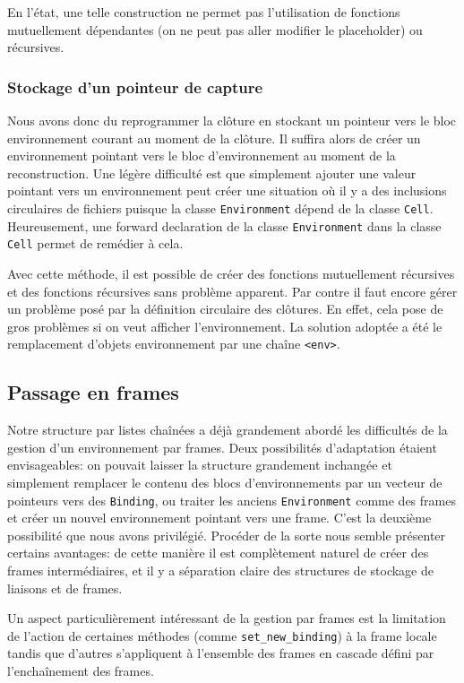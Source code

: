 \documentclass[a4paper,11pt]{article}
\begin{document}
En l'état, une telle construction ne permet pas l'utilisation de fonctions
mutuellement dépendantes (on ne peut pas aller modifier le placeholder) ou
récursives.

\subsubsection{Stockage d'un pointeur de capture}

Nous avons donc du reprogrammer la clôture en stockant un pointeur vers le bloc
environnement courant au moment de la clôture. Il suffira alors de créer un
environnement pointant vers le bloc d'environnement au moment de la reconstruction.
Une légère difficulté est que simplement ajouter une valeur pointant vers un
environnement peut créer une situation où il y a des inclusions circulaires de
fichiers puisque la classe \texttt{Environment} dépend de la classe \texttt{Cell}.
Heureusement, une forward declaration de la classe \texttt{Environment} dans la classe
\texttt{Cell} permet de remédier à cela.

Avec cette méthode, il est possible de créer des fonctions mutuellement
récursives et des fonctions récursives sans problème apparent. Par contre il
faut encore gérer un problème posé par la définition circulaire des clôtures.
En effet, cela pose de gros problèmes si on veut afficher l'environnement. La
solution adoptée a été le remplacement d'objets environnement par une chaîne
\texttt{<env>}.

\subsection{Passage en frames}

Notre structure par listes chaînées a déjà grandement abordé les difficultés de la
gestion d'un environnement par frames. Deux possibilités d'adaptation étaient
envisageables: on pouvait laisser la structure grandement inchangée et
simplement remplacer le contenu des blocs d'environnements par un vecteur de
pointeurs vers des \texttt{Binding}, ou traiter les anciens
\texttt{Environment} comme des frames et créer un nouvel environnement pointant
vers une frame. C'est la deuxième possibilité que nous avons privilégié.
Procéder de la sorte nous semble présenter certains avantages: de cette manière
il est complètement naturel de créer des frames intermédiaires, et il y a
séparation claire des structures de stockage de liaisons et de frames.

Un aspect particulièrement intéressant de la gestion par frames est la limitation
de l'action de certaines méthodes (comme \texttt{set\_new\_binding}) à la frame
locale tandis que d'autres s'appliquent à l'ensemble des frames en cascade
défini par l'enchaînement des frames.
\end{document}
